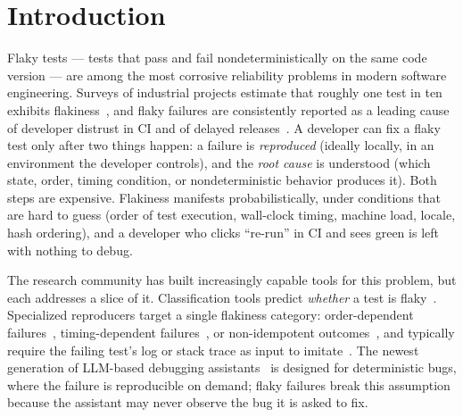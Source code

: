 \section{Introduction}

Flaky tests — tests that pass and fail nondeterministically on the same code
version — are among the most corrosive reliability problems in modern software
engineering. Surveys of industrial projects estimate that roughly one test in
ten exhibits flakiness~\cite{luo2014empirical,lam2019understanding}, and flaky
failures are consistently reported as a leading cause of developer distrust in
CI and of delayed releases~\cite{google2023flaky,seka2023survey}. A developer
can fix a flaky test only after two things happen: a failure is
\emph{reproduced} (ideally locally, in an environment the developer controls),
and the \emph{root cause} is understood (which state, order, timing condition,
or nondeterministic behavior produces it). Both steps are expensive.
Flakiness manifests probabilistically, under conditions that are hard to guess
(order of test execution, wall-clock timing, machine load, locale, hash
ordering), and a developer who clicks ``re-run'' in CI and sees green is left
with nothing to debug.

The research community has built increasingly capable tools for this problem,
but each addresses a slice of it. Classification tools predict
\emph{whether} a test is flaky~\cite{king2023bayesian,pinto2020understanding,
kim2024large}. Specialized reproducers target a single flakiness
category: order-dependent failures~\cite{lam2019idflakies,parry2022survey},
timing-dependent failures~\cite{chen2024tdrepro}, or non-idempotent
outcomes~\cite{shen2024nidebugger}, and typically require the failing
test's log or stack trace as input to imitate~\cite{chen2024tdrepro}. The
newest generation of LLM-based debugging assistants~\cite{lewis2020retrieval,
zhang2024llamadebug} is designed for deterministic bugs, where the failure is
reproducible on demand; flaky failures break this assumption because the
assistant may never observe the bug it is asked to fix.

